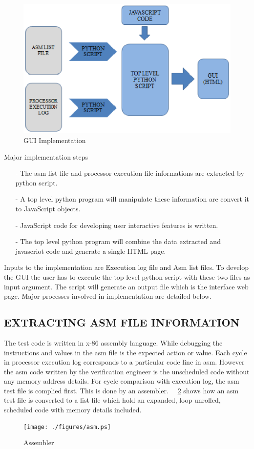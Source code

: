 \begin{figure}[H]
\centering
\includegraphics[width=5.5in]{./figures/gui_impl.eps}
\caption{GUI Implementation} 
\label{fig:gui_impl.eps}
\end{figure}

 Major implementation steps
\begin{itemize}
\item[-] The asm list file and processor execution file informations are extracted by python script.
\item[-] A top level python program will manipulate these information are convert it to JavaScript objects. 
\item[-] JavaScript code for developing user interactive features is written.
\item[-] The top level python program will combine the data extracted and javascriot code and generate a single HTML page. 
\end{itemize}
Inputs to the implementation are Execution log file and Asm list files. To develop the GUI the user has to execute the top level python script with these two files as input argument. The script will generate an output file which is the interface web page. Major processes involved in implementation are detailed below. 


\subsection {EXTRACTING ASM FILE INFORMATION}
The test code is written in x-86 assembly language. While debugging the instructions and values in the asm file is the expected action or value.  Each cycle in processor execution log corresponds to a particular code line in asm. However the asm code written by the verification engineer is the unscheduled code without any memory address details. For cycle comparison with execution log, the asm test file is complied first.  This is done by an assembler. ~\figurename{~\ref{fig:asm.ps}}  shows how an asm test file is converted to a list file which hold an expanded, loop unrolled, scheduled code with memory details included.  
\begin{figure}[H]
\centering
\texttt{[image: ./figures/asm.ps]}
\caption{Assembler}
\label{fig:asm.ps}
\end{figure}



